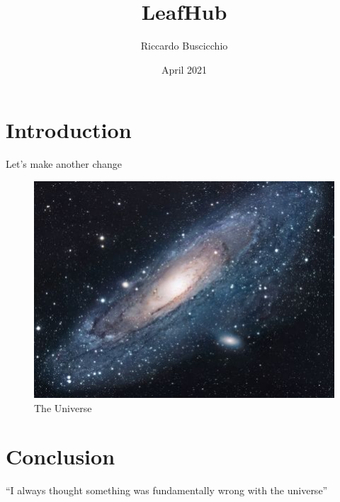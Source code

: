 \documentclass{article}
\title{LeafHub}
\author{Riccardo Buscicchio}
\date{April 2021}
\begin{document}
\maketitle

\section{Introduction}
Let's make another change

\begin{figure}[h!]
\centering
\includegraphics[scale=1.7]{universe}
\caption{The Universe}
\label{fig:universe}
\end{figure}

\section{Conclusion}
``I always thought something was fundamentally wrong with the universe'' \citep{adams1995hitchhiker}



\end{document}
